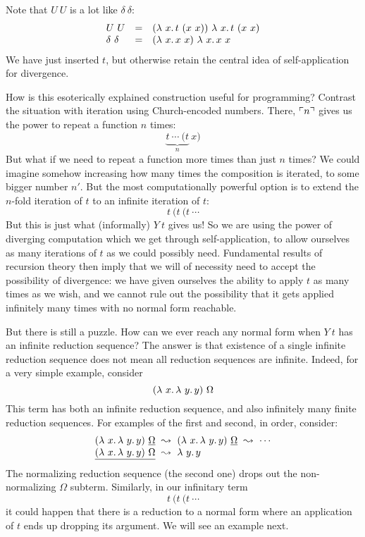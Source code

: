 Note that $U\ U$ is a lot like $\delta\ \delta$:
\[
\begin{array}{lll}
  U\ U & = & (\lambda\ x.\, t\ (x\ x))\ \lambda\ x.\, t\ (x\ x) \\
  \delta\ \delta & = & (\lambda\ x.\, x\ x)\ \lambda\ x.\, x\ x
\end{array}
\]
\noindent We have just inserted $t$, but otherwise retain the central idea of self-application
for divergence.

How is this esoterically explained construction useful for programming?  Contrast
the situation with iteration using Church-encoded numbers.  There, $\ulcorner n \urcorner$ gives us the
power to repeat a function $n$ times:
\[
\underbrace{t\ \cdots\ (t}_n\ x)
\]
\noindent But what if we need to repeat a function more times than
just $n$ times?  We could imagine somehow increasing how many times
the composition is iterated, to some bigger number $n'$.  But the most
computationally powerful option is to extend the $n$-fold iteration of
$t$ to an infinite iteration of $t$:
\[
t\ (t\ (t\ \cdots
\]
\noindent But this is just what (informally) $Y\ t$ gives us!  So we
are using the power of diverging computation which we get through
self-application, to allow ourselves as many iterations of $t$ as we
could possibly need.  Fundamental results of recursion theory then
imply that we will of necessity need to accept the possibility of
divergence: we have given ourselves the ability to apply $t$ as many
times as we wish, and we cannot rule out the possibility that it gets
applied infinitely many times with no normal form reachable.

But there is still a puzzle.  How can we ever reach any normal form when
$Y\ t$ has an infinite reduction sequence?  The answer is that existence
of a single infinite reduction sequence does not mean all reduction
sequences are infinite.  Indeed, for a very simple example, consider
\[
(\lambda\ x.\, \lambda\ y.\, y)\ \Omega
\]
\noindent This term has both an infinite reduction sequence, and also infinitely many finite reduction sequences.  For examples of the first and second, in order, consider:
\[
\begin{array}{l}
  (\lam{x}{\lam{y}{y}})\ \underline{\Omega}\ \leadsto\ (\lam{x}{\lam{y}{y}})\ \underline{\Omega}\ \leadsto \ \cdots \\
  \underline{(\lam{x}{\lam{y}{y}})\ \Omega} \ \leadsto \ \lam{y}{y}
\end{array}
\]
\noindent The normalizing reduction sequence (the second one) drops out the non-normalizing $\Omega$ subterm.
Similarly, in our infinitary term
\[
t\ (t\ (t\ \cdots
\]
\noindent it could happen that there is a reduction to a normal form where an application of $t$ ends up dropping
its argument.  We will see an example next.

